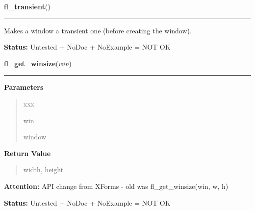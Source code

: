     \label{xformslib:library:fl_transient}

    \vspace{0.5ex}

\hspace{.8\funcindent}\begin{boxedminipage}{\funcwidth}

    \raggedright \textbf{fl\_transient}()

    \vspace{-1.5ex}

    \rule{\textwidth}{0.5\fboxrule}
\setlength{\parskip}{2ex}
    Makes a window a transient one (before creating the window).

\setlength{\parskip}{1ex}
\textbf{Status:} Untested + NoDoc + NoExample = NOT OK



    \end{boxedminipage}

    \label{xformslib:library:fl_get_winsize}

    \vspace{0.5ex}

\hspace{.8\funcindent}\begin{boxedminipage}{\funcwidth}

    \raggedright \textbf{fl\_get\_winsize}(\textit{win})

    \vspace{-1.5ex}

    \rule{\textwidth}{0.5\fboxrule}
\setlength{\parskip}{2ex}
\setlength{\parskip}{1ex}
      \textbf{Parameters}
      \vspace{-1ex}

      \begin{quote}
        \begin{Ventry}{xxx}

          \item[win]

          window

        \end{Ventry}

      \end{quote}

      \textbf{Return Value}
    \vspace{-1ex}

      \begin{quote}
      width, height

      \end{quote}

\textbf{Attention:} API change from XForms - old was fl\_get\_winsize(win, w, h)



\textbf{Status:} Untested + NoDoc + NoExample = NOT OK



    \end{boxedminipage}

